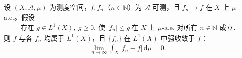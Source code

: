 \documentclass[../../main.tex]{subfiles}%
\begin{document}
\begin{theorem}[Lebesgue]\label{theorem:ch02-Lebesgue控制收敛}
设 $(X,\mathscr A,\mu)$ 为测度空间，$f,f_n$（$n\in\mathbb N$）为 $\mathscr A$-可测，且 $f_n\to f$ 在 $X$ 上 $\mu$-a.e.。假设
\begin{align}
\text{存在 }g\in L^1(X),\ g\geqslant0,\ \text{使}\ |f_n|\leqslant g\ \text{在 }X\text{ 上 }\mu\text{-a.e. 对所有 }n\in\mathbb N\text{ 成立}. \label{align:ch02-2.12}
\end{align}
则 $f$ 与各 $f_n$ 均属于 $L^1(X)$，且 $\{f_n\}$ 在 $L^1(X)$ 中强收敛于 $f$：
\begin{align*}
\lim_{n\to\infty}\int_X|f_n-f|\,\mathrm{d}\mu=0.
\end{align*}
\end{theorem}

\end{document}
